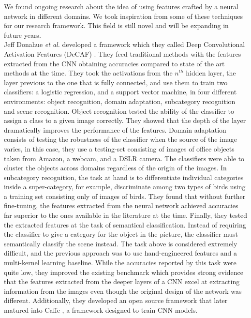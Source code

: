 We found ongoing research about the idea of using features crafted by a neural network in different domains. We took inspiration from some of these techniques for our research framework. This field is still novel and will be expanding in future years.\\

Jeff Donahue \textit{et al.} developed a framework which they called Deep Convolutional Activation Features (DeCAF) \cite{DBLP:journals/corr/DonahueJVHZTD13}. They feed traditional methods with the features extracted from the CNN obtaining accuracies compared to state of the art methods at the time. They took the activations from the $n^{th}$ hidden layer, the layer previous to the one that is fully connected, and use them to train two classifiers: a logistic regression, and a support vector machine, in four different environments: object recognition, domain adaptation, subcategory recognition and scene recognition. Object recognition tested the ability of the classifier to assign a class to a given image correctly. They showed that the depth of the layer dramatically improves the performance of the features. Domain adaptation consists of testing the robustness of the classifier when the source of the image varies, in this case, they use a testing-set consisting of images of office objects taken from Amazon, a webcam, and a DSLR camera. The classifiers were able to cluster the objects across domains regardless of the origin of the images. In subcategory recognition, the task at hand is to differentiate individual categories inside a super-category, for example, discriminate among two types of birds using a training set consisting only of images of birds. They found that without further fine-tuning, the features extracted from the neural network achieved accuracies far superior to the ones available in the literature at the time. Finally, they tested the extracted features at the task of semantical classification. Instead of requiring the classifier to give a category for the object in the picture, the classifier must semantically classify the scene instead. The task above is considered extremely difficult, and the previous approach was to use hand-engineered features and a multi-kernel learning baseline. While the accuracies reported by this task were quite low, they improved the existing benchmark which provides strong evidence that the features extracted from the deeper layers of a CNN excel at extracting information from the images even though the original design of the network was different. Additionally, they developed an open source framework that later matured into Caffe \cite{jia2014caffe}, a framework designed to train CNN models.\\

